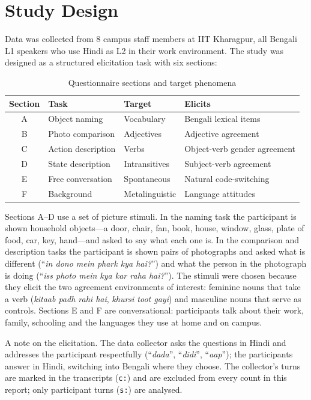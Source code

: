 \documentclass[11pt,a4paper]{report}
\begin{document}
\section{Study Design}

Data was collected from 8 campus staff members at IIT Kharagpur, all Bengali L1 speakers who use Hindi as L2 in their work environment. The study was designed as a structured elicitation task with six sections:

\begin{table}[H]
\centering
\caption{Questionnaire sections and target phenomena}
\label{tab:sections}
\begin{tabular}{clll}
\toprule
\textbf{Section} & \textbf{Task} & \textbf{Target} & \textbf{Elicits} \\
\midrule
A & Object naming & Vocabulary & Bengali lexical items \\
B & Photo comparison & Adjectives & Adjective agreement \\
C & Action description & Verbs & Object-verb gender agreement \\
D & State description & Intransitives & Subject-verb agreement \\
E & Free conversation & Spontaneous & Natural code-switching \\
F & Background & Metalinguistic & Language attitudes \\
\bottomrule
\end{tabular}
\end{table}

Sections A--D use a set of picture stimuli. In the naming task the participant is shown household objects---a door, chair, fan, book, house, window, glass, plate of food, car, key, hand---and asked to say what each one is. In the comparison and description tasks the participant is shown pairs of photographs and asked what is different (``\textit{in dono mein phark kya hai?}'') and what the person in the photograph is doing (``\textit{iss photo mein kya kar raha hai?}''). The stimuli were chosen because they elicit the two agreement environments of interest: feminine nouns that take a verb (\textit{kitaab padh rahi hai}, \textit{khursi toot gayi}) and masculine nouns that serve as controls. Sections E and F are conversational: participants talk about their work, family, schooling and the languages they use at home and on campus.

A note on the elicitation. The data collector asks the questions in Hindi and addresses the participant respectfully (``\textit{dada}'', ``\textit{didi}'', ``\textit{aap}''); the participants answer in Hindi, switching into Bengali where they choose. The collector's turns are marked in the transcripts (\texttt{c:}) and are excluded from every count in this report; only participant turns (\texttt{s:}) are analysed.
\end{document}
